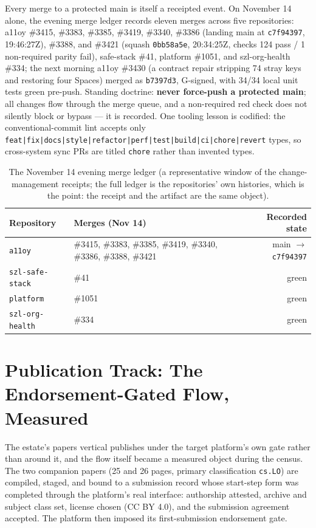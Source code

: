 Every merge to a protected main is itself a receipted event. On November 14 alone, the evening merge ledger records eleven merges across five repositories: a11oy \#3415, \#3383, \#3385, \#3419, \#3340, \#3386 (landing main at \texttt{c7f94397}, 19:46:27Z), \#3388, and \#3421 (squash \texttt{0bb58a5e}, 20:34:25Z, checks 124 pass / 1 non-required parity fail), safe-stack \#41, platform \#1051, and szl-org-health \#334; the next morning a11oy \#3430 (a contract repair stripping 74 stray keys and restoring four Spaces) merged as \texttt{b7397d3}, G-signed, with 34/34 local unit tests green pre-push. Standing doctrine: \textbf{never force-push a protected main}; all changes flow through the merge queue, and a non-required red check does not silently block or bypass --- it is recorded. One tooling lesson is codified: the conventional-commit lint accepts only \texttt{feat|fix|docs|style|refactor|perf|test|build|ci|chore|revert} types, so cross-system sync PRs are titled \texttt{chore} rather than invented types.

\begin{table}[htbp]
\centering
\small
\begin{tabular}{llr}
\toprule
\textbf{Repository} & \textbf{Merges (Nov 14)} & \textbf{Recorded state} \\
\midrule
\texttt{a11oy} & \#3415, \#3383, \#3385, \#3419, \#3340, \#3386, \#3388, \#3421 & main $\to$ \texttt{c7f94397} \\
\texttt{szl-safe-stack} & \#41 & green \\
\texttt{platform} & \#1051 & green \\
\texttt{szl-org-health} & \#334 & green \\
\bottomrule
\end{tabular}
\caption{The November 14 evening merge ledger (a representative window of the change-management receipts; the full ledger is the repositories' own histories, which is the point: the receipt and the artifact are the same object).}
\label{tab:merges}
\end{table}

\section{Publication Track: The Endorsement-Gated Flow, Measured}
\label{sec:pubtrack}

The estate's papers vertical publishes under the target platform's own gate rather than around it, and the flow itself became a measured object during the census. The two companion papers (25 and 26 pages, primary classification \texttt{cs.LO}) are compiled, staged, and bound to a submission record whose start-step form was completed through the platform's real interface: authorship attested, archive and subject class set, license chosen (CC BY 4.0), and the submission agreement accepted. The platform then imposed its first-submission endorsement gate.

